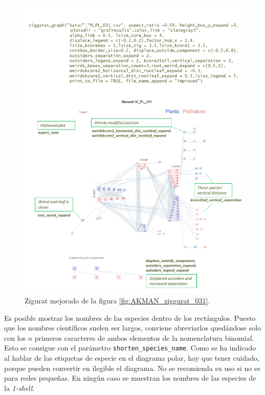 \clearpage
\begin{figure}[hp!]
\centering
\includegraphics[scale=0.8]{ManFigs/M_PL_031_ziggurat_improved.pdf}
\caption {Zigurat mejorado de la figura \ref{fig:AKMAN_ziggurat_031}.}
\label{fig:M_PL_031_ziggurat_improved}
\end{figure}


\clearpage
Es posible mostrar los nombres de las especies dentro de los rectángulos. Puesto que los nombres científicos suelen ser largos, conviene abreviarlos quedándose solo con los $n$ primeros caracteres de ambos elementos de la nomenclatura binomial. Esto se consigue con el parámetro \texttt{shorten\_species\_name}. Como se ha indicado al hablar de las etiquetas de especie en el diagrama polar, hay que tener cuidado, porque pueden convertir en ilegible el diagrama. No se recomienda su uso si no es para redes pequeñas. En ningún caso se muestran los nombres de las especies de la \textit{1-shell}.

